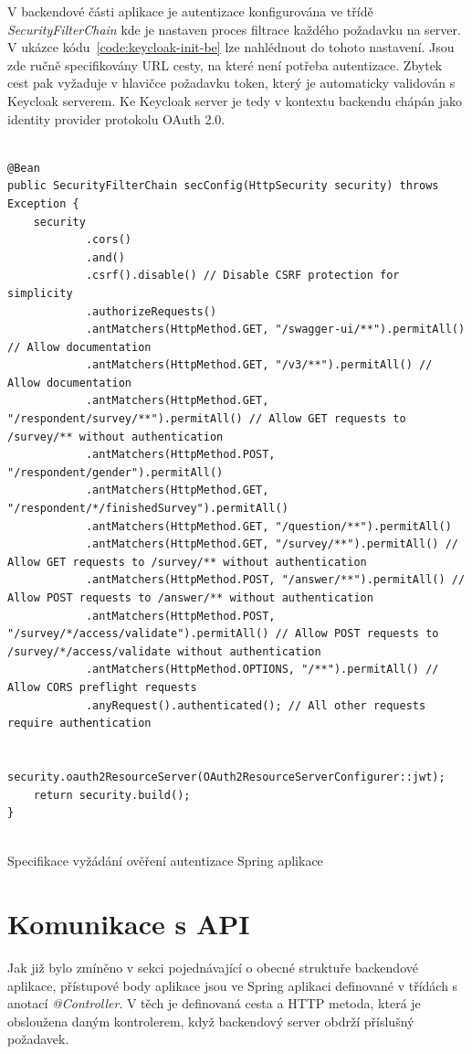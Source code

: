 V backendové části aplikace je autentizace konfigurována ve třídě \textit{SecurityFilterChain} kde
je nastaven proces filtrace každého požadavku na server. V ukázce kódu~\ref{code:keycloak-init-be} lze nahlédnout
do tohoto nastavení. Jsou zde ručně specifikovány URL cesty, na které není potřeba autentizace. Zbytek cest pak
vyžaduje v hlavičce požadavku token, který je automaticky validován s Keycloak serverem. Ke Keycloak server je tedy v kontextu backendu
chápán jako identity provider protokolu OAuth 2.0.

\begin{listing}[h!]
    \begin{verbatim}
   
@Bean
public SecurityFilterChain secConfig(HttpSecurity security) throws Exception {
    security
            .cors()
            .and()
            .csrf().disable() // Disable CSRF protection for simplicity
            .authorizeRequests()
            .antMatchers(HttpMethod.GET, "/swagger-ui/**").permitAll() // Allow documentation
            .antMatchers(HttpMethod.GET, "/v3/**").permitAll() // Allow documentation
            .antMatchers(HttpMethod.GET, "/respondent/survey/**").permitAll() // Allow GET requests to /survey/** without authentication
            .antMatchers(HttpMethod.POST, "/respondent/gender").permitAll()
            .antMatchers(HttpMethod.GET, "/respondent/*/finishedSurvey").permitAll()
            .antMatchers(HttpMethod.GET, "/question/**").permitAll()
            .antMatchers(HttpMethod.GET, "/survey/**").permitAll() // Allow GET requests to /survey/** without authentication
            .antMatchers(HttpMethod.POST, "/answer/**").permitAll() // Allow POST requests to /answer/** without authentication
            .antMatchers(HttpMethod.POST, "/survey/*/access/validate").permitAll() // Allow POST requests to /survey/*/access/validate without authentication
            .antMatchers(HttpMethod.OPTIONS, "/**").permitAll() // Allow CORS preflight requests
            .anyRequest().authenticated(); // All other requests require authentication

    security.oauth2ResourceServer(OAuth2ResourceServerConfigurer::jwt);
    return security.build();
}


    \end{verbatim}
\caption{Specifikace vyžádání ověření autentizace Spring aplikace}
\label{code:keycloak-init-be}
\end{listing}

\section{Komunikace s API}
Jak již bylo zmíněno v sekci pojednávající o obecné struktuře backendové aplikace, přístupové body aplikace jsou ve Spring aplikaci
definované v třídách s anotací \textit{@Controller}. V těch je definovaná cesta a HTTP metoda, která je obsloužena daným kontrolerem, když
backendový server obdrží příslušný požadavek.

